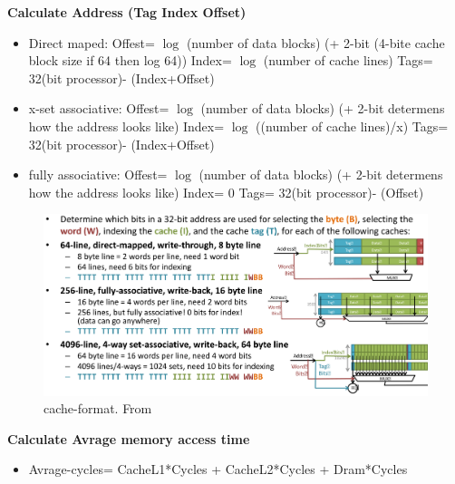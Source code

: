 \textbf{Calculate Address (Tag Index Offset)} %
\begin{itemize}
\item  Direct maped: \newline
  Offest= $\log$ (number of data blocks)  (+ 2-bit (4-bite cache block size if 64 then log 64)) \newline
  Index= $\log$ (number of cache lines) \newline
  Tags= 32(bit processor)- (Index+Offset) 
\item  x-set associative: \newline
  Offest= $\log$ (number of data blocks)  (+ 2-bit determens how the address looks like) \newline
  Index= $\log$ ((number of cache lines)/x) \newline
  Tags= 32(bit processor)- (Index+Offset)
\item  fully associative: \newline
  Offest= $\log$ (number of data blocks)  (+ 2-bit determens how the address looks like) \newline
  Index= 0 \newline
  Tags= 32(bit processor)- (Offset)
\end{itemize}

\begin{figure}[H]
    \centering
    \includegraphics[width=16cm]{image/cache-format.png}
    \caption{cache-format. From \cite{ca}}
\end{figure}


\textbf{Calculate Avrage memory access time}
\begin{itemize}
\item  Avrage-cycles= CacheL1*Cycles + CacheL2*Cycles + Dram*Cycles
\end{itemize}

